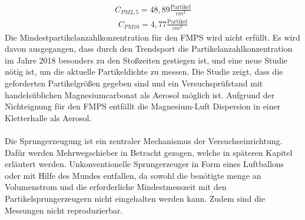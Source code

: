 \begin{align*}
C_{PM 2,5} = 48,89 \frac{\text{Partikel}}{cm^3}
\end{align*}
\begin{align*}
C_{PM 10} = 4,77 \frac{\text{Partikel}}{cm^3}
\end{align*}
Die Mindestpartikelanzahlkonzentration f\"{u}r den FMPS wird nicht erf\"{u}llt. Es wird davon ausgegangen, dass durch den Trendsport die Partikelanzahlkonzentration im Jahre 2018 besonders zu den Sto{\ss}zeiten gestiegen ist, und eine neue Studie n\"{o}tig ist, um die aktuelle Partikeldichte zu messen. Die Studie zeigt, dass die geforderten Partikelgr\"{o}{\ss}en gegeben sind und ein Versuchspr\"{u}fstand mit handels\"{u}blichen Magnesiumcarbonat als Aerosol m\"{o}glich ist. Aufgrund der Nichteignung f\"{u}r den FMPS entf\"{a}llt die Magnesium-Luft Dispersion in einer Kletterhalle als Aerosol.
\\\\
Die Sprungerzeugung ist ein zentraler Mechanismus der Versuchseinrichtung. Daf\"{u}r werden Mehrwegschieber in Betracht gezogen, welche in sp\"{a}teren Kapitel erl\"{a}utert werden. Unkonventionelle Sprungerzeuger in Form eines Luftballons oder mit Hilfe des Mundes entfallen, da sowohl die ben\"{o}tigte menge an Volumenstrom und die erforderliche Mindestmesszeit mit den Partikelsprungerzeugern nicht eingehalten werden kann. Zudem sind die Messungen nicht reproduzierbar.
